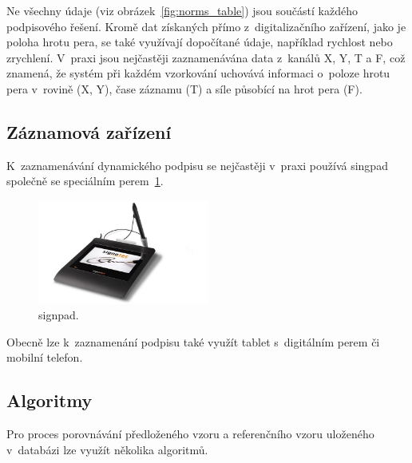 Ne všechny údaje (viz obrázek~\ref{fig:norms_table}) jsou součástí každého podpisového řešení. 
Kromě dat získaných přímo z~digitalizačního zařízení, jako je poloha hrotu pera, se také využívají dopočítané údaje, například rychlost nebo zrychlení. 
V~praxi jsou nejčastěji zaznamenávána data z~kanálů X, Y, T a F, což znamená, že systém při každém vzorkování uchovává informaci o~poloze hrotu pera v~rovině (X, Y), čase záznamu (T) a síle působící na hrot pera (F).~\cite{DSM2021b}

\subsection*{Záznamová zařízení}
K~zaznamenávání dynamického podpisu se nejčastěji v~praxi používá singpad společně se speciálním perem~\ref{fig:signpad}.

\begin{figure}[h]
  \centering
  \includegraphics[width=0.5\textwidth]{obrazky-figures/signpad.jpg}
  \caption{signpad.~\cite{SignPadImage}} %
  \label{fig:signpad}
\end{figure}

Obecně lze k~zaznamenání podpisu také využít tablet s~digitálním perem či mobilní telefon.

\subsection*{Algoritmy}
Pro proces porovnávání předloženého vzoru a referenčního vzoru uloženého v~databázi lze využít několika algoritmů.

